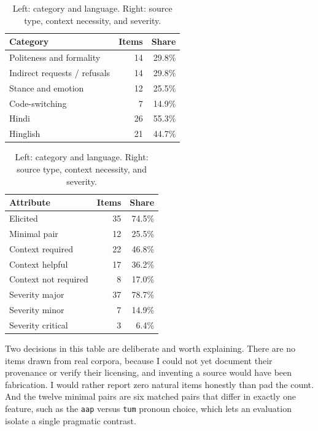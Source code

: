 \documentclass[11pt]{article}
\newcommand{\code}[1]{\texttt{\small #1}}
\begin{document}
\begin{table}[h]
\centering
\small
\begin{minipage}[t]{0.48\textwidth}
\centering
\begin{tabular}{@{}lrr@{}}
\toprule
\textbf{Category} & \textbf{Items} & \textbf{Share} \\
\midrule
Politeness and formality      & 14 & 29.8\% \\
Indirect requests / refusals  & 14 & 29.8\% \\
Stance and emotion            & 12 & 25.5\% \\
Code-switching                & 7  & 14.9\% \\
\midrule
Hindi                         & 26 & 55.3\% \\
Hinglish                      & 21 & 44.7\% \\
\bottomrule
\end{tabular}
\end{minipage}
\hfill
\begin{minipage}[t]{0.48\textwidth}
\centering
\begin{tabular}{@{}lrr@{}}
\toprule
\textbf{Attribute} & \textbf{Items} & \textbf{Share} \\
\midrule
Elicited            & 35 & 74.5\% \\
Minimal pair        & 12 & 25.5\% \\
\midrule
Context required    & 22 & 46.8\% \\
Context helpful     & 17 & 36.2\% \\
Context not required& 8  & 17.0\% \\
\midrule
Severity major      & 37 & 78.7\% \\
Severity minor      & 7  & 14.9\% \\
Severity critical   & 3  & 6.4\% \\
\bottomrule
\end{tabular}
\end{minipage}
\caption{Left: category and language. Right: source type, context necessity, and severity.}
\label{tab:cat}\label{tab:ctx}
\end{table}

Two decisions in this table are deliberate and worth explaining. There are no items
drawn from real corpora, because I could not yet document their provenance or verify
their licensing, and inventing a source would have been fabrication. I
would rather report zero natural items honestly than pad the count. And the twelve
minimal pairs are six matched pairs that differ in exactly one feature, such as the
\code{aap} versus \code{tum} pronoun choice, which lets an evaluation isolate a
single pragmatic contrast.
\end{document}
